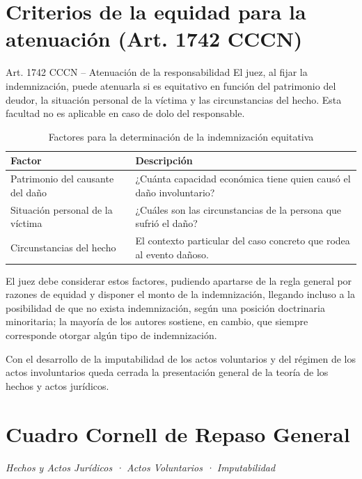 \documentclass[12pt,oneside]{book}
\begin{document}
\section{Criterios de la equidad para la atenuación (Art. 1742 CCCN)}

\begin{definition}{Art. 1742 CCCN -- Atenuación de la responsabilidad}
El juez, al fijar la indemnización, puede atenuarla si es equitativo en función del patrimonio del deudor, la situación personal de la víctima y las circunstancias del hecho. Esta facultad no es aplicable en caso de dolo del responsable.
\end{definition}

\begin{table}[H]
\centering
\caption{Factores para la determinación de la indemnización equitativa}
\begin{tabularx}{\textwidth}{l X}
\toprule
\textbf{Factor} & \textbf{Descripción} \\
\midrule
Patrimonio del causante del daño & ¿Cuánta capacidad económica tiene quien causó el daño involuntario? \\
Situación personal de la víctima & ¿Cuáles son las circunstancias de la persona que sufrió el daño? \\
Circunstancias del hecho & El contexto particular del caso concreto que rodea al evento dañoso. \\
\bottomrule
\end{tabularx}
\end{table}

El juez debe considerar estos factores, pudiendo apartarse de la regla general por razones de equidad y disponer el monto de la indemnización, llegando incluso a la posibilidad de que no exista indemnización, según una posición doctrinaria minoritaria; la mayoría de los autores sostiene, en cambio, que siempre corresponde otorgar algún tipo de indemnización.

Con el desarrollo de la imputabilidad de los actos voluntarios y del régimen de los actos involuntarios queda cerrada la presentación general de la teoría de los hechos y actos jurídicos.


\section{Cuadro Cornell de Repaso General}
\textit{Hechos y Actos Jurídicos · Actos Voluntarios · Imputabilidad}
\end{document}
